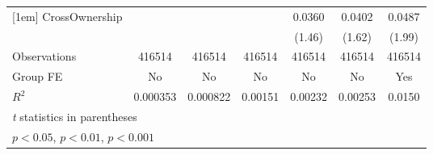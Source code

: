 {\begin{tabular}{l*{6}{c}}
[1em]
CrossOwnership  &                  &                  &                  &   0.0360         &   0.0402         &   0.0487         \\
                &                  &                  &                  &   (1.46)         &   (1.62)         &   (1.99)         \\
\hline
Observations    &   416514         &   416514         &   416514         &   416514         &   416514         &   416514         \\
Group FE        &       No         &       No         &       No         &       No         &       No         &      Yes         \\
$ R^2 $         & 0.000353         & 0.000822         &  0.00151         &  0.00232         &  0.00253         &   0.0150         \\
\hline\hline
\multicolumn{7}{l}{\footnotesize \textit{t} statistics in parentheses}\\
\multicolumn{7}{l}{\footnotesize \sym{*} \(p<0.05\), \sym{**} \(p<0.01\), \sym{***} \(p<0.001\)}\\
\end{tabular}
}
